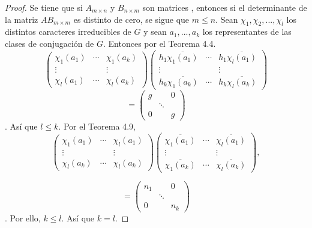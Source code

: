 \documentclass[12pt]{book}
\theoremstyle{definition}
\newcounter{in}
\begin{document}
\begin{proof}
  Se tiene que si $A_{m\times n}$ y $B_{n\times m}$ son matrices , entonces si el
  determinante de la matriz $AB_{m\times m}$ es distinto de cero, se sigue que $m \leq n$.
  Sean $\chi_{1}, \chi_{2},...,\chi_{l}$ los distintos caracteres irreducibles de $G$ y sean $a_{1},...,a_{k}$ los representantes de las clases de conjugación de $G$. Entonces por el Teorema 4.4.
\begin{equation*}
  \begin{pmatrix}
    \chi_{1}(a_{1}) & \cdots & \chi_{1}(a_{k}) \\ 
    \vdots &  & \vdots \\
    \chi_{l}(a_{1}) & \cdots & \chi_{l}(a_{k})
  \end{pmatrix}
  \begin{pmatrix}
    h_{1} \overline{\chi_{1}(a_{1})} & \cdots & h_{1} \overline{\chi_{l}(a_{1})} \\ 
    \vdots &  & \vdots \\
    h_{k} \overline{\chi_{1}(a_{k})} & \cdots & h_{k} \overline{\chi_{l}(a_{k})}  
  \end{pmatrix}
\end{equation*}
\begin{equation*}
  =
  \begin{pmatrix}
   g & & 0\\ 
     & \ddots & \\
     0 &  & g
  \end{pmatrix}   
  \end{equation*}.
  Así que $l \leq k$. Por el Teorema 4.9,
\begin{equation*}
  \begin{pmatrix}
    \chi_{1}(a_{1}) & \cdots & \chi_{l}(a_{1}) \\ 
    \vdots &  & \vdots \\
    \chi_{l}(a_{k}) & \cdots & \chi_{l}(a_{k})
  \end{pmatrix}
  \begin{pmatrix}
     \overline{\chi_{1}(a_{1})} & \cdots &  \overline{\chi_{l}(a_{1})} \\ 
    \vdots &  & \vdots \\
     \overline{\chi_{1}(a_{k})} & \cdots &  \overline{\chi_{l}(a_{k})}  
  \end{pmatrix},
\end{equation*}

\begin{equation*}
  =
  \begin{pmatrix}
   n_{1} & & 0\\ 
     & \ddots & \\
     0 &  & n_{k}
  \end{pmatrix}
\end{equation*}.
Por ello, $k \leq l$. Así que $k=l$.
\end{proof}
\end{document}
